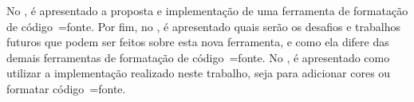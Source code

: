 No ,
é apresentado a proposta e
implementação de uma ferramenta de formatação de código~=fonte.
Por fim,
no ,
é apresentado quais serão os desafios e
trabalhos futuros que podem ser feitos sobre esta nova ferramenta,
e como ela difere das demais ferramentas de formatação de código~=fonte.
No ,
é apresentado como utilizar a implementação realizado neste trabalho,
seja para adicionar cores ou
formatar código~=fonte.
